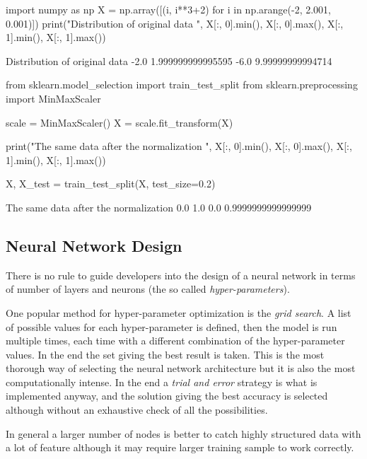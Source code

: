 \begin{ipython}
import numpy as np
X = np.array([(i, i**3+2) for i in np.arange(-2, 2.001, 0.001)])
print("Distribution of original data ", X[:, 0].min(), X[:, 0].max(), 
X[:, 1].min(), X[:, 1].max())
\end{ipython}
\begin{ioutput}
Distribution of original data  -2.0 1.999999999995595 -6.0 9.99999999994714
\end{ioutput}

\begin{ipython}
from sklearn.model_selection import train_test_split
from sklearn.preprocessing import MinMaxScaler

scale = MinMaxScaler()
X = scale.fit_transform(X)

print("The same data after the normalization ", X[:, 0].min(), X[:, 0].max(), 
X[:, 1].min(), X[:, 1].max())

X, X_test = train_test_split(X, test_size=0.2)
\end{ipython}
\begin{ioutput}
The same data after the normalization  0.0 1.0 0.0 0.9999999999999999
\end{ioutput}

\subsection{Neural Network Design}
\label{neural-network-design}

There is no rule to guide developers into the design of a neural network in terms of number of layers and neurons (the so called \emph{hyper-parameters}). 

One popular method for hyper-parameter optimization is the \emph{grid search}. 
A list of possible values for each hyper-parameter is defined, then the model is run multiple times, each time with a different combination of the hyper-parameter values. In the end the set giving the best result is taken. This is the most thorough way of selecting the neural network architecture but it is also the most computationally intense.
In the end a \emph{trial and error} strategy is what is implemented anyway, and the solution giving the best accuracy is selected although without an exhaustive check of all the possibilities.

In general a larger number of nodes is better to catch highly structured data with a lot of feature although it may require larger training sample to work correctly.

